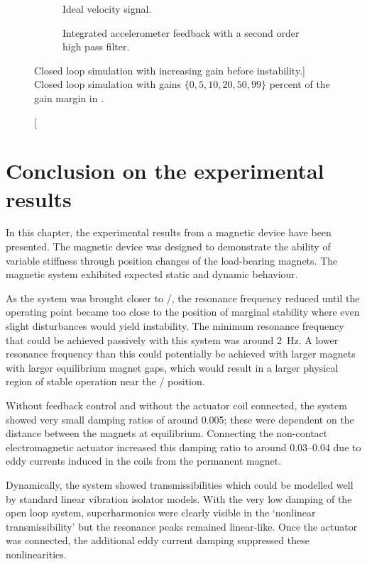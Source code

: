 \documentclass[11pt,a4paper]{memoir}
\begin{document}
\begin{figure}[t]
  \begin{wide}
  \begin{subfigure}
    \caption{Ideal velocity signal.}
  \end{subfigure}
  \hfil
  \begin{subfigure}
    \caption{Integrated accelerometer feedback with a second order high pass filter.}
  \end{subfigure}
  \end{wide}
  \caption
  [Closed loop simulation with increasing gain before instability.]
  {Closed loop simulation with gains $\{0, 5, 10, 20, 50, 99\}$ percent of the gain margin in .}
\end{figure}

\section{Conclusion on the experimental results}

In this chapter, the experimental results from a magnetic device have been presented.
The magnetic device was designed to demonstrate the ability of variable stiffness through position changes of the load-bearing magnets.
The magnetic system exhibited expected static and dynamic behaviour.

As the system was brought closer to \qzs/, the resonance frequency reduced until the operating point became too close to the position of marginal stability where even slight disturbances would yield instability.
The minimum resonance frequency that could be achieved passively with this system was around \SI{2}{Hz}.
A lower resonance frequency than this could potentially be achieved with larger magnets with larger equilibrium magnet gaps, which would result in a larger physical region of stable operation near the \qzs/ position.

Without feedback control and without the actuator coil connected, the system showed very small damping ratios of around \num{0.005}; these were dependent on the distance between the magnets at equilibrium.
Connecting the non-contact electromagnetic actuator increased this damping ratio to around \num{0.03}--\num{0.04} due to eddy currents induced in the coils from the permanent magnet.

Dynamically, the system showed transmissibilities which could be modelled well by standard linear vibration isolator models.
With the very low damping of the open loop system, superharmonics were clearly visible in the `nonlinear transmissibility' but the resonance peaks remained linear-like.
Once the actuator was connected, the additional eddy current damping suppressed these nonlinearities.
\end{document}
